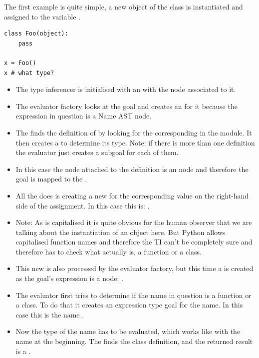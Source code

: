 \documentclass[12pt,halfparskip,DIV11,BCOR10mm]{scrreprt}
\begin{document}
The first example is quite simple, a new object of the class  is instantiated and assigned to the variable . 

\begin{lstlisting}
class Foo(object):
    pass

x = Foo()
x # what type?
\end{lstlisting}

\begin{itemize}
    \item The type inferencer is initialised with an  with the node  associated to it.
    \item The evaluator factory looks at the goal and creates an  for it because the expression in question is a Name AST node.
    \item The  finds the definition of  by looking for the corresponding  in the module. It then creates a  to determine its type. Note: if there is more than one definition the evaluator just creates a subgoal for each of them. 
    \item In this case the node attached to the definition is an  node and therefore the goal is mapped to the .
    \item All the  does is creating a new  for the corresponding value on the right-hand side of the assignment. In this case this is: .
    \item Note: As  is capitalised it is quite obvious for the human observer that we are talking about the instantiation of an object here. But Python allows capitalised function names and therefore the TI can't be completely sure and therefore has to check what  actually is, a function or a class.
    \item This new  is also processed by the evaluator factory, but this time a  is created as the goal's expression is a  node: .
    \item The evaluator first tries to determine if the name in question is a function or a class. To do that it creates an expression type goal for the name. In this case this is the name .
    \item Now the type of the name  has to be evaluated, which works like with the  name at the beginning. The  finds the class definition, and the returned result is a .

\end{itemize}
\end{document}
